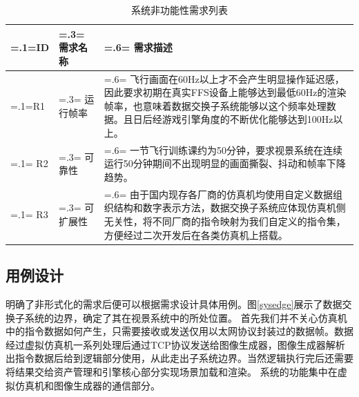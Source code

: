 \begin{table}[h!]
    \begin{center}
        \caption{系统非功能性需求列表}
        \label{unfuncreq}
        \renewcommand\arraystretch{1.5}
        \begin{tabularx}{\textwidth}{ 
            | >{\centering\arraybackslash\hsize=.1\hsize\linewidth=\hsize}X 
            | >{\centering\arraybackslash\hsize=.3\hsize\linewidth=\hsize}X 
            | >{\raggedright\arraybackslash\hsize=.6\hsize\linewidth=\hsize}X 
            | }
            \hline
            \textbf{ID} & \textbf{需求名称} & \textbf{需求描述}\\
            \hline
            R1 & 运行帧率 & 飞行画面在60Hz以上才不会产生明显操作延迟感，因此要求初期在真实FFS设备上能够达到最低60Hz的渲染帧率，也意味着数据交换子系统能够以这个频率处理数据。且日后经游戏引擎角度的不断优化能够达到100Hz以上。\\
            \hline
            R2 & 可靠性 & 一节飞行训练课约为50分钟，要求视景系统在连续运行50分钟期间不出现明显的画面撕裂、抖动和帧率下降趋势。\\
            \hline
            R3 & 可扩展性 & 由于国内现存各厂商的仿真机均使用自定义数据组织结构和数字表示方法，数据交换子系统应体现仿真机侧无关性，将不同厂商的指令映射为我们自定义的指令集，方便经过二次开发后在各类仿真机上搭载。\\
            \hline
        \end{tabularx}
    \end{center}
\end{table}

\subsection{用例设计}
明确了非形式化的需求后便可以根据需求设计具体用例。图\ref{sysedge}展示了数据交换子系统的边界，确定了其在视景系统中的所处位置。
首先我们并不关心仿真机中的指令数据如何产生，只需要接收或发送仅用以太网协议封装过的数据帧。数据经过虚拟仿真机一系列处理后通过TCP协议发送给图像生成器，图像生成器解析出指令数据后给到逻辑部分使用，从此走出子系统边界。当然逻辑执行完后还需要将结果交给资产管理和引擎核心部分实现场景加载和渲染。
系统的功能集中在虚拟仿真机和图像生成器的通信部分。

